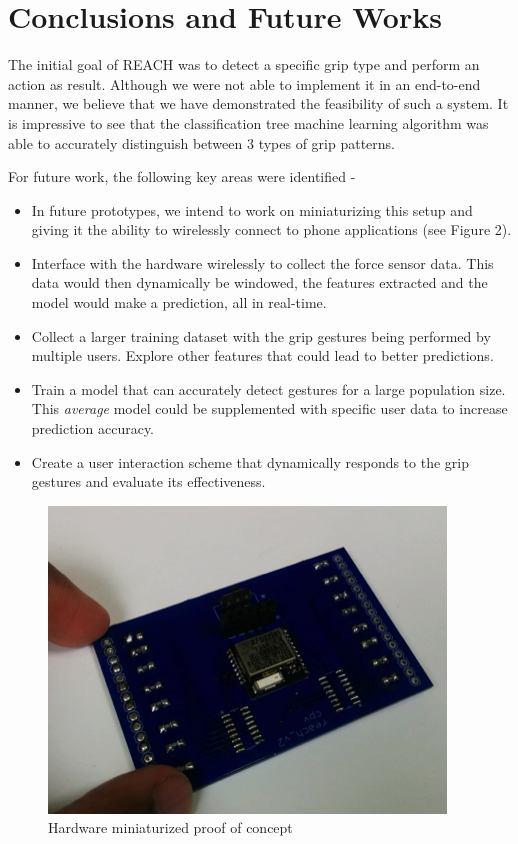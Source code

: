 \section{Conclusions and Future Works}

The initial goal of REACH was to detect a specific grip type and perform an action as result. Although we were not able to implement it in an end-to-end manner, we believe that we have demonstrated the feasibility of such a system. It is impressive to see that the classification tree machine learning algorithm was able to accurately distinguish between 3 types of grip patterns.

\par
For future work, the following key areas were identified - 
\begin{itemize}
  \item In future prototypes, we intend to work on miniaturizing this setup and giving it the ability to wirelessly connect to phone applications (see Figure 2).
  
  \item Interface with the hardware wirelessly to collect the force sensor data. This data would then dynamically be windowed, the features extracted and the model would make a prediction, all in real-time.
  
  \item Collect a larger training dataset with the grip gestures being performed by multiple users. Explore other features that could lead to better predictions.
  
  \item Train a model that can accurately detect gestures for a large population size. This \textit{average} model could be supplemented with specific user data to increase prediction accuracy. 
  
  \item Create a user interaction scheme that dynamically responds to the grip gestures and evaluate its effectiveness.

\end{itemize}

\begin{figure}[h]
\includegraphics[width=.45\textwidth]{hardware_mini.png}
\caption{Hardware miniaturized proof of concept}
\label{fig:hardware_mini}
\end{figure}

